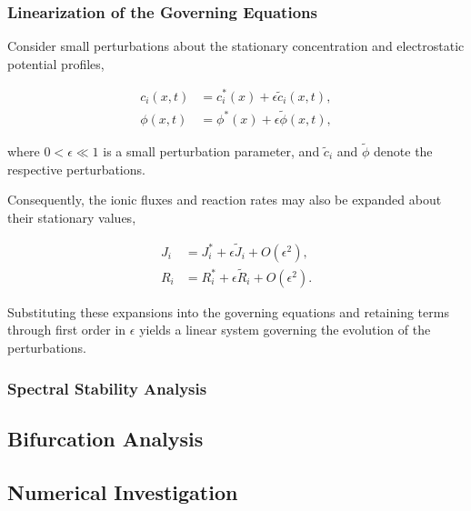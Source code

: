 \documentclass[11pt]{article}
\begin{document}
\subsubsection{Linearization of the Governing Equations}

Consider small perturbations about the stationary
concentration and electrostatic potential profiles,

\begin{equation}
    \begin{aligned}
        c_i(x,t)
        &=c_i^*(x)+\epsilon\widetilde{c}_i(x,t),\\
        \phi(x,t)
        &=\phi^*(x)+\epsilon\widetilde{\phi}(x,t),
    \end{aligned}
    \label{eq:perturbation_expansion}
\end{equation}

where $0<\epsilon\ll 1$ is a small perturbation
parameter, and $\widetilde{c}_i$ and
$\widetilde{\phi}$ denote the respective
perturbations.

Consequently, the ionic fluxes and reaction rates
may also be expanded about their stationary values,

\begin{equation}
    \begin{aligned}
        J_i
        &=J_i^*+\epsilon\widetilde{J}_i
        +O(\epsilon^2),\\
        R_i
        &=R_i^*+\epsilon\widetilde{R}_i
        +O(\epsilon^2).
    \end{aligned}
    \label{eq:flux_reaction_expansion}
\end{equation}

Substituting these expansions into the governing
equations and retaining terms through first order
in $\epsilon$ yields a linear system governing
the evolution of the perturbations.

\subsubsection{Spectral Stability Analysis}

\subsection{Bifurcation Analysis}

\subsection{Numerical Investigation}
\end{document}
